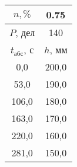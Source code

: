 \begin{tabular}[t]{|c|c|}
\hline
$n, \%$ & 0.75 \\
\hline
$P$, дел & 140 \\
\hline
$t_{абс}$, с & $h$, мм \\ 
\hline
0,0 & 200,0 \\ 
53,0 & 190,0 \\ 
106,0 & 180,0 \\ 
163,0 & 170,0 \\ 
220,0 & 160,0 \\ 
281,0 & 150,0 \\ 
\hline
\end{tabular}
